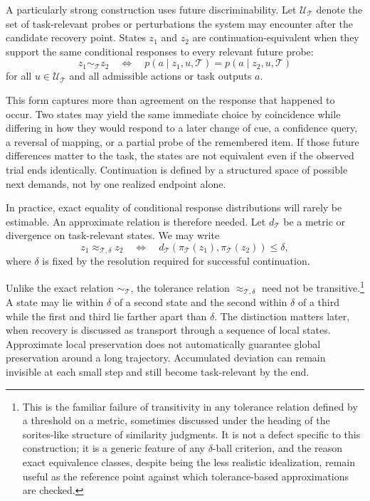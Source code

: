 \documentclass[11pt]{book}
\begin{document}
A particularly strong construction uses future discriminability. Let $\mathcal U_{\mathcal T}$ denote the set of task-relevant probes or perturbations the system may encounter after the candidate recovery point. States $z_1$ and $z_2$ are continuation-equivalent when they support the same conditional responses to every relevant future probe:
\[
z_1\sim_{\mathcal T}z_2
\quad\Longleftrightarrow\quad
p(a\mid z_1,u,\mathcal T)
=
p(a\mid z_2,u,\mathcal T)
\]
for all $u\in\mathcal U_{\mathcal T}$ and all admissible actions or task outputs $a$.

This form captures more than agreement on the response that happened to occur. Two states may yield the same immediate choice by coincidence while differing in how they would respond to a later change of cue, a confidence query, a reversal of mapping, or a partial probe of the remembered item. If those future differences matter to the task, the states are not equivalent even if the observed trial ends identically. Continuation is defined by a structured space of possible next demands, not by one realized endpoint alone.

In practice, exact equality of conditional response distributions will rarely be estimable. An approximate relation is therefore needed. Let $d_{\mathcal T}$ be a metric or divergence on task-relevant states. We may write
\[
z_1\approx_{\mathcal T,\delta}z_2
\quad\Longleftrightarrow\quad
d_{\mathcal T}\!\left(
\pi_{\mathcal T}(z_1),
\pi_{\mathcal T}(z_2)
\right)
\leq\delta,
\]
where $\delta$ is fixed by the resolution required for successful continuation.

Unlike the exact relation $\sim_{\mathcal T}$, the tolerance relation $\approx_{\mathcal T,\delta}$ need not be transitive.\footnote{This is the familiar failure of transitivity in any tolerance relation defined by a threshold on a metric, sometimes discussed under the heading of the sorites-like structure of similarity judgments. It is not a defect specific to this construction; it is a generic feature of any $\delta$-ball criterion, and the reason exact equivalence classes, despite being the less realistic idealization, remain useful as the reference point against which tolerance-based approximations are checked.} A state may lie within $\delta$ of a second state and the second within $\delta$ of a third while the first and third lie farther apart than $\delta$. The distinction matters later, when recovery is discussed as transport through a sequence of local states. Approximate local preservation does not automatically guarantee global preservation around a long trajectory. Accumulated deviation can remain invisible at each small step and still become task-relevant by the end.
\end{document}
